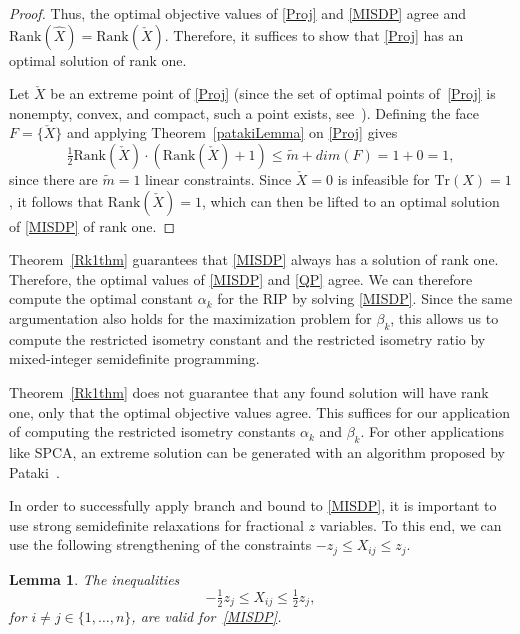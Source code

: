 \documentclass[journal]{IEEEtran}
\newtheorem{lemma}[theorem]{Lemma}
\newcommand{\Tr}{\text{Tr}}
\newcommand{\Rk}{\text{Rank}}
\begin{document}
\begin{proof}
  Thus, the optimal objective values of \eqref{Proj} and \eqref{MISDP}
  agree and $\Rk(\hat{X}) = \Rk(\check{X})$.  Therefore, it
  suffices to show that \eqref{Proj} has an optimal solution of rank one.

  Let $\check{X}$ be an extreme point of \eqref{Proj} (since the set of
  optimal points of~\eqref{Proj} is nonempty, convex, and compact, such a
  point exists, see~\cite[Corollary 18.5.1]{Roc70}). Defining the face $F =
  \{\check{X}\}$ and applying Theorem~\ref{patakiLemma} on \eqref{Proj}
  gives
  \begin{equation*}
    \tfrac{1}{2} \Rk(\check{X}) \cdot (\Rk(\check{X})+1) \leq \tilde{m} + dim(F) = 1 + 0 = 1,
  \end{equation*}
  since there are $\tilde{m} = 1$ linear constraints. Since $\check{X} = 0$
  is infeasible for $\Tr(X) = 1$, it follows that $\Rk(\check{X}) = 1$,
  which can then be lifted to an optimal solution of \eqref{MISDP} of rank
  one.
\end{proof}

Theorem~\ref{Rk1thm} guarantees that \eqref{MISDP} always has a solution of
rank one. Therefore, the optimal values of \eqref{MISDP} and \eqref{QP}
agree. We can therefore compute the optimal constant $\alpha_k$ for the RIP
by solving \eqref{MISDP}. Since the same argumentation also holds for the
maximization problem for $\beta_k$, this allows us to compute the
restricted isometry constant and the restricted isometry ratio by
mixed-integer semidefinite programming.

Theorem~\ref{Rk1thm} does not guarantee that any
found solution will have rank one, only that the optimal objective
values agree. This suffices for our application of
computing the restricted isometry constants $\alpha_k$ and $\beta_k$. For other
applications like SPCA, an extreme solution can be generated with an
algorithm proposed by Pataki~\cite{coneLP}.

In order to successfully apply branch and bound to \eqref{MISDP}, it is
important to use strong semidefinite relaxations for fractional $z$
variables. To this end, we can use the following strengthening of the
constraints $-z_j \leq X_{ij} \leq z_j$.

\begin{lemma}\label{HalfConstraint} 
  The inequalities
  \begin{equation}\label{eq:HalfConstraint}
    -\tfrac{1}{2} z_j \leq X_{ij} \leq \tfrac{1}{2} z_j,
  \end{equation}
  for $i \neq j \in \{1, \dots, n\}$, are valid for~\eqref{MISDP}.
\end{lemma}
\end{document}
